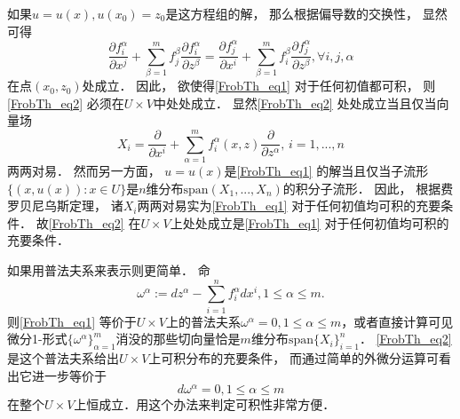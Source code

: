 如果$u=u(x),u(x_0)=z_0$是这方程组的解， 那么根据偏导数的交换性， 显然可得
\begin{equation}\label{FrobTh_eq2}
\frac{\partial f_i^\alpha}{\partial x^j}+\sum_{\beta=1}^mf_j^\beta\frac{\partial f_i^\alpha}{\partial z^\beta}
=\frac{\partial f_j^\alpha}{\partial x^i}+\sum_{\beta=1}^mf_i^\beta\frac{\partial f_j^\alpha}{\partial z^\beta},\forall i,j,\alpha
\end{equation}
在点$(x_0,z_0)$处成立． 因此， 欲使得\autoref{FrobTh_eq1} 对于任何初值都可积， 则\autoref{FrobTh_eq2} 必须在$U\times V$中处处成立． 显然\autoref{FrobTh_eq2} 处处成立当且仅当向量场
$$
X_i=\frac{\partial}{\partial x^i}+\sum_{\alpha=1}^mf_i^\alpha(x,z)\frac{\partial}{\partial z^\alpha},\,i=1,...,n
$$
两两对易． 然而另一方面， $u=u(x)$是\autoref{FrobTh_eq1} 的解当且仅当子流形$\{(x,u(x)):x\in U\}$是$n$维分布$\text{span}(X_1,...,X_n)$的积分子流形． 因此， 根据费罗贝尼乌斯定理， 诸$X_i$两两对易实为\autoref{FrobTh_eq1} 对于任何初值均可积的充要条件． 故\autoref{FrobTh_eq2} 在$U\times V$上处处成立是\autoref{FrobTh_eq1} 对于任何初值均可积的充要条件．

如果用普法夫系来表示则更简单． 命
\begin{equation}\label{FrobTh_eq3}
\omega^\alpha:=dz^\alpha-\sum_{i=1}^nf_i^\alpha dx^i,1\leq\alpha\leq m.
\end{equation}
则\autoref{FrobTh_eq1} 等价于$U\times V$上的普法夫系$\omega^\alpha=0,1\leq\alpha\leq m$，或者直接计算可见微分1-形式$\{\omega^\alpha\}_{\alpha=1}^m$消没的那些切向量恰是$m$维分布$\text{span}\{X_i\}_{i=1}^n$． \autoref{FrobTh_eq2} 是这个普法夫系给出$U\times V$上可积分布的充要条件， 而通过简单的外微分运算可看出它进一步等价于
$$
d\omega^\alpha=0,1\leq\alpha\leq m
$$
在整个$U\times V$上恒成立．用这个办法来判定可积性非常方便．